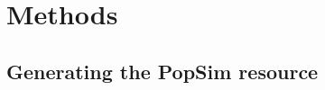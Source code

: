 \documentclass[12pt,halfline,a4paper]{ouparticle}
\newcommand{\dadi}{$\partial a \partial i$\xspace}
\newcommand{\MSMC}{\texttt{MSMC}\xspace}
\newcommand{\adk}[1]{\textcolor{red}{ADK: #1}}
\begin{document}


\section*{Methods}
\subsection*{Generating the PopSim resource}
\end{document}
